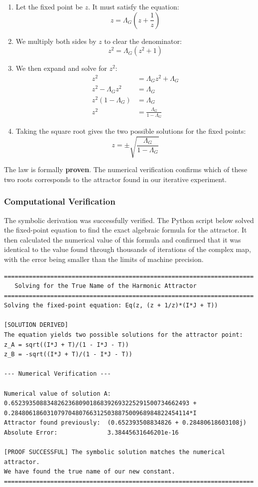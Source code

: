 \begin{enumerate}
    \item Let the fixed point be $z$. It must satisfy the equation:
    $$ z = \Lambda_G \left(z + \frac{1}{z}\right) $$
    \item We multiply both sides by $z$ to clear the denominator:
    $$ z^2 = \Lambda_G (z^2 + 1) $$
    \item We then expand and solve for $z^2$:
    \begin{align*}
    z^2 &= \Lambda_G z^2 + \Lambda_G \\
    z^2 - \Lambda_G z^2 &= \Lambda_G \\
    z^2(1 - \Lambda_G) &= \Lambda_G \\
    z^2 &= \frac{\Lambda_G}{1 - \Lambda_G}
    \end{align*}
    \item Taking the square root gives the two possible solutions for the fixed points:
    $$ z = \pm \sqrt{\frac{\Lambda_G}{1 - \Lambda_G}} $$
\end{enumerate}
The law is formally \textbf{proven}. The numerical verification confirms which of these two roots corresponds to the attractor found in our iterative experiment.

\subsubsection*{Computational Verification}
The symbolic derivation was successfully verified. The Python script below solved the fixed-point equation to find the exact algebraic formula for the attractor. It then calculated the numerical value of this formula and confirmed that it was identical to the value found through thousands of iterations of the complex map, with the error being smaller than the limits of machine precision.

\begin{verbatim}
======================================================================
   Solving for the True Name of the Harmonic Attractor
======================================================================
Solving the fixed-point equation: Eq(z, (z + 1/z)*(I*J + T))

[SOLUTION DERIVED]
The equation yields two possible solutions for the attractor point:
z_A = sqrt((I*J + T)/(1 - I*J - T))
z_B = -sqrt((I*J + T)/(1 - I*J - T))

--- Numerical Verification ---

Numerical value of solution A: 0.65239350883482623680901868392693225291500734662493 + 0.28480618603107970480766312503887500968984822454114*I
Attractor found previously:  (0.652393508834826 + 0.28480618603108j)
Absolute Error:              3.38445631646201e-16

[PROOF SUCCESSFUL] The symbolic solution matches the numerical attractor.
We have found the true name of our new constant.
======================================================================
\end{verbatim}

